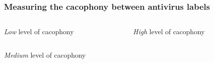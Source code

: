 \begin{frame}
    \frametitle{Measuring the cacophony between antivirus labels}
    \centering

    \bigskip{}

    \begin{columns}
        \begin{column}{0.5\textwidth}
            \begin{table}[!ht]
                \resizebox{0.97\textwidth}{!}{
                    
                }
                \smallskip{}
                \caption{\footnotesize{\textit{Low} level of cacophony}}
            \end{table}
        \end{column}

        \begin{column}{0.5\textwidth}
            \begin{table}[!ht]
                \resizebox{\textwidth}{!}{
                    
                }
                \smallskip{}
                \caption{\footnotesize{\textit{High} level of cacophony}}
            \end{table}
        \end{column}
    \end{columns}

    \medskip{}

    \begin{table}[!ht]
        \resizebox{0.5\textwidth}{!}{
            
        }
        \smallskip{}
        \caption{\footnotesize{\textit{Medium} level of cacophony}}
    \end{table}

\end{frame}

